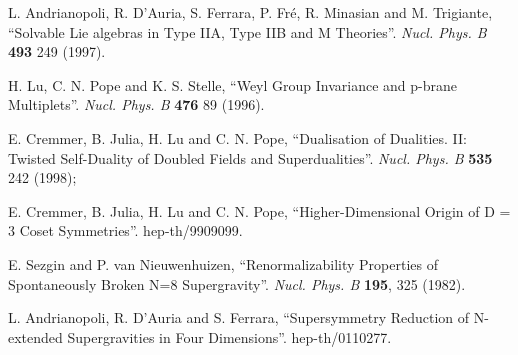 \documentclass[a4paper,12pt]{article}
\begin{document}
\begin{thebibliography}{99}
L. Andrianopoli, R. D'Auria, S. Ferrara, P. Fr\'e, R. Minasian and
M. Trigiante, ``Solvable Lie algebras in Type IIA, Type IIB and M
Theories''. {\it Nucl. Phys. B} {\bf 493} 249 (1997).

H. Lu, C. N. Pope and K. S. Stelle, ``Weyl Group Invariance and
p-brane Multiplets''. {\it Nucl.  Phys. B} {\bf 476} 89 (1996).


E. Cremmer, B. Julia, H. Lu and C. N. Pope, ``Dualisation of
Dualities. II: Twisted Self-Duality of Doubled Fields  and
Superdualities''. {\it Nucl. Phys.  B} {\bf 535} 242 (1998);

E. Cremmer, B. Julia, H. Lu and C. N. Pope, ``Higher-Dimensional
Origin of D = 3 Coset Symmetries''. hep-th/9909099.



E. Sezgin and P. van Nieuwenhuizen, ``Renormalizability Properties
of Spontaneously Broken N=8 Supergravity''. {\it Nucl. Phys.  B}
{\bf 195}, 325 (1982).


L. Andrianopoli, R. D'Auria and S. Ferrara, ``Supersymmetry
Reduction of N-extended Supergravities in Four  Dimensions''.
hep-th/0110277.


\end{thebibliography}
\end{document}

